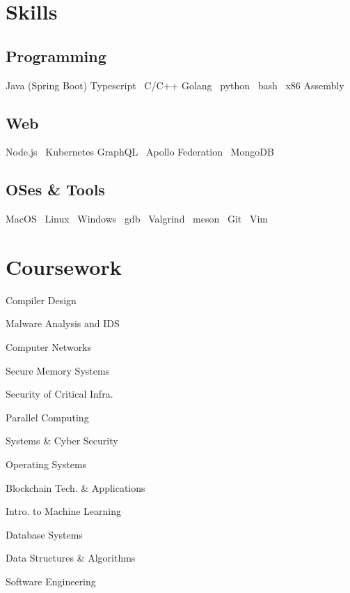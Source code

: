 \documentclass[a4paper]{deedy-resume-reversed}
\begin{document}
\begin{minipage}[t]{0.33\textwidth}
\section{Skills}
\subsection{Programming}
    Java (Spring Boot) \textbullet Typescript  \textbullet\ C/C++ \textbullet Golang \textbullet\
    python \textbullet\ bash \textbullet\ x86 Assembly
\sectionsep

\subsection{Web}
    Node.js \textbullet\ Kubernetes \textbullet{} GraphQL \textbullet\ Apollo Federation \textbullet\ MongoDB
\sectionsep

    \subsection{OSes \& Tools}
    MacOS \textbullet\ Linux \textbullet\ Windows \textbullet\ gdb \textbullet\ Valgrind \textbullet\ meson \textbullet\ Git \textbullet\ Vim
\sectionsep


\section{Coursework}
\vspace{10pt} %
\begin{tightemize}
\item Compiler Design
\item Malware Analysis and IDS
\item Computer Networks
\item Secure Memory Systems
\item Security of Critical Infra.
\item Parallel Computing
\item Systems \& Cyber Security
\item Operating Systems
\item Blockchain Tech. \& Applications
\item Intro. to Machine Learning
\item Database Systems
\item Data Structures \& Algorithms
\item Software Engineering
\end{tightemize}
\sectionsep


\end{minipage}
\end{document}
